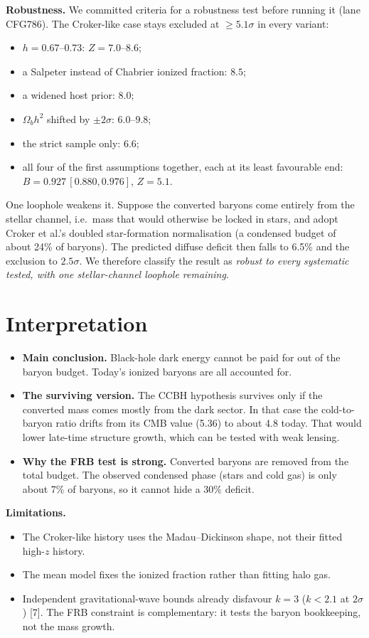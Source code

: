 \documentclass[10pt]{article}
\begin{document}
\textbf{Robustness.} We committed criteria for a robustness test before running it (lane CFG786). The Croker-like case stays excluded at $\ge5.1\sigma$ in every variant:
\begin{itemize}
\item $h=0.67$--$0.73$: $Z=7.0$--$8.6$;
\item a Salpeter instead of Chabrier ionized fraction: $8.5$;
\item a widened host prior: $8.0$;
\item $\Omega_bh^2$ shifted by $\pm2\sigma$: $6.0$--$9.8$;
\item the strict sample only: $6.6$;
\item all four of the first assumptions together, each at its least favourable end: $B=0.927\,[0.880,0.976]$, $Z=5.1$.
\end{itemize}
One loophole weakens it. Suppose the converted baryons come entirely from the stellar channel, i.e.\ mass that would otherwise be locked in stars, and adopt Croker et al.'s doubled star-formation normalisation (a condensed budget of about 24\% of baryons). The predicted diffuse deficit then falls to 6.5\% and the exclusion to $2.5\sigma$. We therefore classify the result as \emph{robust to every systematic tested, with one stellar-channel loophole remaining}.

\section{Interpretation}
\begin{itemize}
\item \textbf{Main conclusion.} Black-hole dark energy cannot be paid for out of the baryon budget. Today's ionized baryons are all accounted for.
\item \textbf{The surviving version.} The CCBH hypothesis survives only if the converted mass comes mostly from the dark sector. In that case the cold-to-baryon ratio drifts from its CMB value (5.36) to about 4.8 today. That would lower late-time structure growth, which can be tested with weak lensing.
\item \textbf{Why the FRB test is strong.} Converted baryons are removed from the total budget. The observed condensed phase (stars and cold gas) is only about 7\% of baryons, so it cannot hide a 30\% deficit.
\end{itemize}

\textbf{Limitations.}
\begin{itemize}
\item The Croker-like history uses the Madau--Dickinson shape, not their fitted high-$z$ history.
\item The mean model fixes the ionized fraction rather than fitting halo gas.
\item Independent gravitational-wave bounds already disfavour $k=3$ ($k<2.1$ at $2\sigma$) [7]. The FRB constraint is complementary: it tests the baryon bookkeeping, not the mass growth.
\end{itemize}
\end{document}

